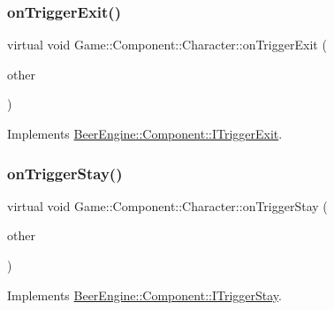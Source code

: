 \subsubsection{\texorpdfstring{on\+Trigger\+Exit()}{onTriggerExit()}}
{\footnotesize\ttfamily virtual void Game\+::\+Component\+::\+Character\+::on\+Trigger\+Exit (\begin{DoxyParamCaption}\item[{\mbox{\hyperlink{class_beer_engine_1_1_component_1_1_a_collider}{Beer\+Engine\+::\+Component\+::\+A\+Collider}} $\ast$}]{other }\end{DoxyParamCaption})\hspace{0.3cm}{\ttfamily [virtual]}}



Implements \mbox{\hyperlink{class_beer_engine_1_1_component_1_1_i_trigger_exit_ad5bc744f738cb2c52de40b243954967f}{Beer\+Engine\+::\+Component\+::\+I\+Trigger\+Exit}}.

\mbox{\label{class_game_1_1_component_1_1_character_ab0ac4d77a9403cded5c52d77121a625c}} 
\subsubsection{\texorpdfstring{on\+Trigger\+Stay()}{onTriggerStay()}}
{\footnotesize\ttfamily virtual void Game\+::\+Component\+::\+Character\+::on\+Trigger\+Stay (\begin{DoxyParamCaption}\item[{\mbox{\hyperlink{class_beer_engine_1_1_component_1_1_a_collider}{Beer\+Engine\+::\+Component\+::\+A\+Collider}} $\ast$}]{other }\end{DoxyParamCaption})\hspace{0.3cm}{\ttfamily [virtual]}}



Implements \mbox{\hyperlink{class_beer_engine_1_1_component_1_1_i_trigger_stay_ae0b762108ab5484071657e13f7a2cbd7}{Beer\+Engine\+::\+Component\+::\+I\+Trigger\+Stay}}.

\mbox{\label{class_game_1_1_component_1_1_character_a4f77e3bf02c40339350f47626d57dad8}} 
